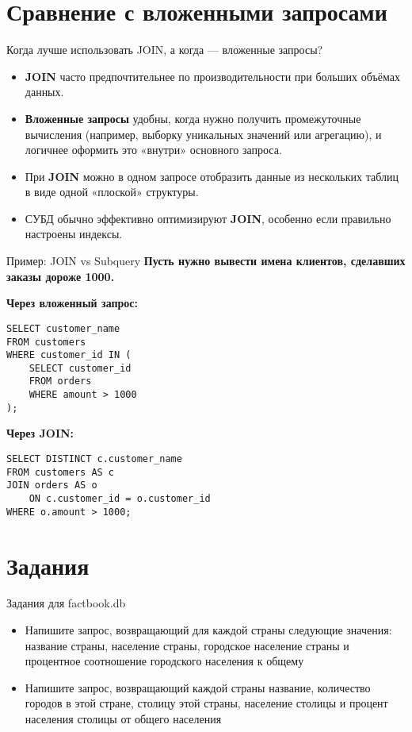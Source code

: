 \documentclass{beamer}
\begin{document}
\section{Сравнение с вложенными запросами}
\begin{frame}{Когда лучше использовать JOIN, а когда — вложенные запросы?}
	\begin{itemize}
		\item \textbf{JOIN} часто предпочтительнее по производительности при больших объёмах данных.
		\item \textbf{Вложенные запросы} удобны, когда нужно получить промежуточные вычисления
		      (например, выборку уникальных значений или агрегацию), и логичнее оформить это «внутри» основного запроса.
		\item При \textbf{JOIN} можно в одном запросе отобразить данные из нескольких таблиц
		      в виде одной «плоской» структуры.
		\item СУБД обычно эффективно оптимизируют \textbf{JOIN}, особенно если правильно настроены индексы.
	\end{itemize}
\end{frame}

\begin{frame}[fragile]{Пример: JOIN vs Subquery}
	\textbf{Пусть нужно вывести имена клиентов, сделавших заказы дороже 1000.}

	\textbf{Через вложенный запрос:}
	\begin{verbatim}
SELECT customer_name
FROM customers
WHERE customer_id IN (
    SELECT customer_id
    FROM orders
    WHERE amount > 1000
);
\end{verbatim}

	\textbf{Через JOIN:}
	\begin{verbatim}
SELECT DISTINCT c.customer_name
FROM customers AS c
JOIN orders AS o
    ON c.customer_id = o.customer_id
WHERE o.amount > 1000;
\end{verbatim}
\end{frame}

\section{Задания}


\begin{frame}[fragile]{Задания для factbook.db}
	\begin{itemize}
		\item Напишите запрос, возвращающий для каждой страны следующие значения: название страны, население страны, городское население страны и процентное соотношение городского населения к общему
		\item Напишите запрос, возвращающий каждой страны название, количество городов в этой стране, столицу этой страны, население столицы и процент населения столицы от общего населения
	\end{itemize}
\end{frame}
\end{document}
